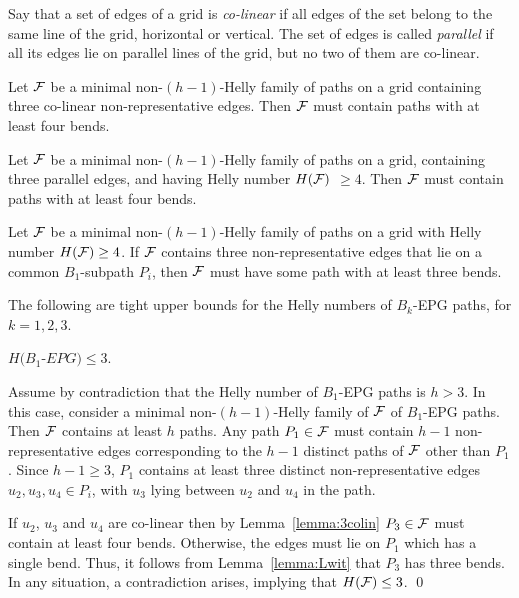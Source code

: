 Say that a set of edges of a grid is {\it co-linear} if all edges of the set belong to the same line of the grid, horizontal or vertical. The set of edges is called {\it parallel} if all its edges lie on parallel lines of the grid, but no two of them are co-linear.  


\begin{lemma}
\label{lemma:3colin}
Let $\cal {F}$ be a minimal non-$(h-1)$-Helly family of paths on a grid containing three co-linear non-representative edges. Then $\cal{F}$ must contain paths with at least four bends.
\end{lemma}



\begin{lemma}
\label{lemma:3par}
Let $\cal{F}$ be a minimal non-$(h-1)$-Helly family of paths on a grid, containing three parallel edges, and having  Helly number $H(\cal{F})$   $\geq 4$. Then $\cal{F}$ must contain paths with at least four bends. 
\end{lemma}


\begin{lemma} \label{lemma:Lwit}
Let $\cal{F}$ be a minimal non-$(h-1)$-Helly family of paths on a grid with  Helly number $H({\cal F}) \geq 4$. If ${\cal F}$ contains three non-representative edges that lie on a common $B_1$-subpath $P_i$, then $\cal {F}$ must have some path with at least three bends. \end{lemma}


The following are tight upper bounds for the Helly numbers of $B_k$-EPG paths, for $k = 1,2,3$.

\begin{claim}\label{claim:upper-B1}
$H(B_1$-$EPG) \leq 3.$
\end{claim}
 
\proof
Assume by contradiction that the Helly number of $B_1$-EPG paths is $h > 3$. In this case, consider a minimal non-$(h-1)$-Helly family of $\cal F$ of $B_1$-EPG paths. Then $\cal F$ contains at least $h$ paths.  
Any path $P_1 \in \cal{F}$ must contain $h-1$ non-representative edges  corresponding to the $h-1$ distinct paths of $\cal F$ other than $P_1$. Since $h-1 \geq 3$, $P_1$ contains at least three distinct non-representative edges $u_2, u_3, u_4 \in P_i$, with $u_3$ lying  between $u_2$ and $u_4$ in the path.   

If $u_2$, $u_3$ and $u_4$ are co-linear then by Lemma~\ref{lemma:3colin} $P_3 \in \cal{F}$ must contain at least four bends. Otherwise, the edges must lie on $P_1$ which has a single bend. Thus, it follows from Lemma~\ref{lemma:Lwit} that $P_3$ has three bends. In any situation, a contradiction arises, implying that $H({\cal F}) \leq 3$.
\qed


